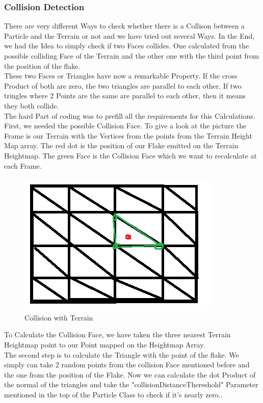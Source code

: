 \documentclass{sig-alternate-05-2015}
\begin{document}
\subsubsection{Collision Detection}
There are very different Ways to check whether there is a Collison between a Particle and the Terrain or not and we have tried out several Ways. In the End, we had the Idea to simply check if two Faces collides. One calculated from the possible colliding Face of the Terrain and the other one with the third point from the position of the flake. \\
These two Faces or Triangles have now a remarkable Property. If the cross Product of both are zero, the two triangles are parallel to each other. If two tringles where 2 Points are the same are parallel to each other, then it means they both collide. \\
The hard Part of coding was to prefill all the requirements for this Calculations.\\
First, we needed the possible Collision Face. To give a look at the picture the Frame is our Terrain with the Vertices from the points from the Terrain Height Map array. The red dot is the position of our Flake emitted on the Terrain Heightmap. The green Face is the Collision Face which we want to recalculate at each Frame. \\
\begin{figure}[!htbp]
  \begin{center}
\includegraphics[scale=0.75]{CollisionTerrain.png}
  \end{center}
  \caption{Collision with Terrain}
\end{figure}

To Calculate the Collision Face, we have taken the three nearest Terrain Heightmap point to our Point mapped on the Heightmap Array. \\
The second step is to calculate the Triangle with the point of the flake. We simply can take 2 random points from the collision Face mentioned before and the one from the position of the Flake. 
Now we can calculate the dot Product of the normal of the triangles and take the "collisionDistanceThereshold" Parameter mentioned in the top of the Particle Class to check if it's nearly zero..\\
\end{document}
